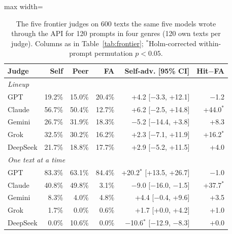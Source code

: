 \begin{table}[t]
\centering\small
\setlength\tabcolsep{2.5pt}
\begin{adjustbox}{max width=\linewidth}
\begin{tabular}{l rrr rr}
\toprule
Judge & Self & Peer & FA & Self-adv. [95\% CI] & Hit$-$FA \\
\midrule
\multicolumn{6}{l}{\emph{Lineup}} \\
GPT & 19.2\% & 15.0\% & 20.4\% & +4.2 [$-$3.3, +12.1] & $-$1.2 \\
Claude & 56.7\% & 50.4\% & 12.7\% & +6.2 [$-$2.5, +14.8] & +44.0$^{*}$ \\
Gemini & 26.7\% & 31.9\% & 18.3\% & $-$5.2 [$-$14.4, +3.8] & +8.3 \\
Grok & 32.5\% & 30.2\% & 16.2\% & +2.3 [$-$7.1, +11.9] & +16.2$^{*}$ \\
DeepSeek & 21.7\% & 18.8\% & 17.7\% & +2.9 [$-$5.2, +11.5] & +4.0 \\
\midrule
\multicolumn{6}{l}{\emph{One text at a time}} \\
GPT & 83.3\% & 63.1\% & 84.4\% & +20.2$^{*}$ [+13.5, +26.7] & $-$1.0 \\
Claude & 40.8\% & 49.8\% & 3.1\% & $-$9.0 [$-$16.0, $-$1.5] & +37.7$^{*}$ \\
Gemini & 8.3\% & 4.0\% & 4.8\% & +4.4 [$-$0.4, +9.6] & +3.5 \\
Grok & 1.7\% & 0.0\% & 0.6\% & +1.7 [+0.0, +4.2] & +1.0 \\
DeepSeek & 0.0\% & 10.6\% & 0.0\% & $-$10.6$^{*}$ [$-$12.9, $-$8.3] & +0.0 \\
\bottomrule
\end{tabular}
\end{adjustbox}
\caption{The five frontier judges on 600 texts the same five models wrote through the API for 120 prompts in four genres (120 own texts per judge). Columns as in Table~\ref{tab:frontier}; $^{*}$Holm-corrected within-prompt permutation $p<0.05$.}
\label{tab:frontier120}
\end{table}

